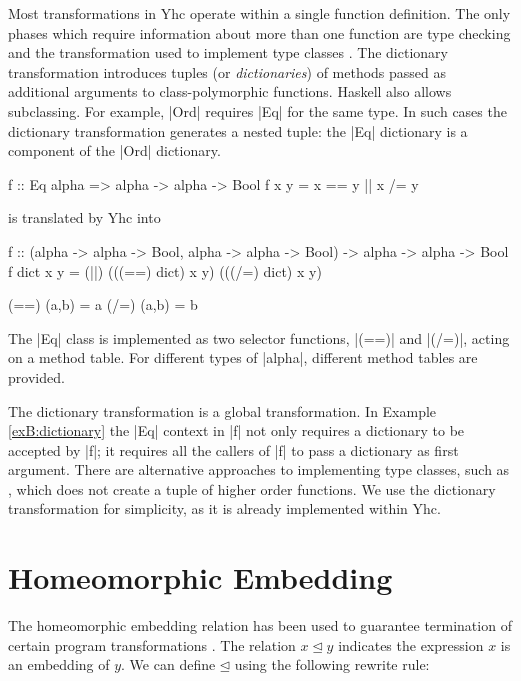 Most transformations in Yhc operate within a single function definition. The only phases which require information about more than one function are type checking and the transformation used to implement type classes \citep{wadler:type_classes}. The dictionary transformation introduces tuples (or \textit{dictionaries}) of methods passed as additional arguments to class-polymorphic functions. Haskell also allows subclassing. For example, |Ord| requires |Eq| for the same type. In such cases the dictionary transformation generates a nested tuple: the |Eq| dictionary is a component of the |Ord| dictionary.

\begin{example}
\label{exB:dictionary}
\begin{code}
f :: Eq alpha => alpha -> alpha -> Bool
f x y = x == y || x /= y
\end{code}

\noindent is translated by Yhc into

\ignore\begin{code}
f :: (alpha -> alpha -> Bool, alpha -> alpha -> Bool) -> alpha -> alpha -> Bool
f dict x y = (||) (((==) dict) x y) (((/=) dict) x y)

(==) (a,b) = a
(/=) (a,b) = b
\end{code}

The |Eq| class is implemented as two selector functions, |(==)| and |(/=)|, acting on a method table. For different types of |alpha|, different method tables are provided.
\end{example}

The dictionary transformation is a global transformation. In Example \ref{exB:dictionary} the |Eq| context in |f| not only requires a dictionary to be accepted by |f|; it requires all the callers of |f| to pass a dictionary as first argument. There are alternative approaches to implementing type classes, such as \citet{jones:dictionary_free}, which does not create a tuple of higher order functions. We use the dictionary transformation for simplicity, as it is already implemented within Yhc.


\section{Homeomorphic Embedding}
\label{secB:homeomorphic}

The homeomorphic embedding relation \cite{leuschel:homeomorphic} has been used to guarantee termination of certain program transformations \cite{sorensen:supercompilation}. The relation $x \unlhd y$ indicates the expression $x$ is an embedding of $y$. We can define $\unlhd$ using the following rewrite rule:

